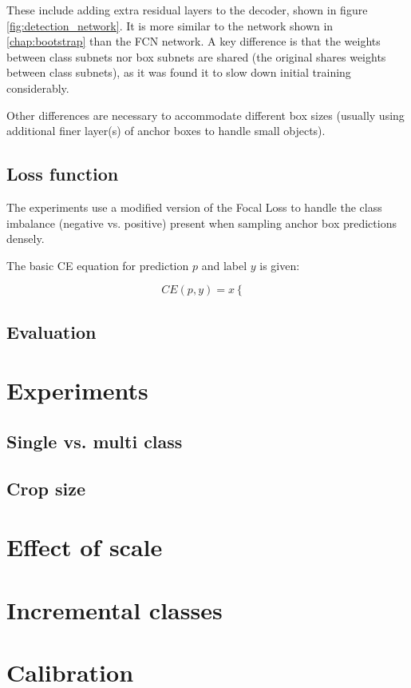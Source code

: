 These include adding extra residual layers to the decoder, shown in figure \ref{fig:detection_network}. It is more similar to the network shown in  \ref{chap:bootstrap} than the \gls{FCN} network. A key difference is that the weights between class subnets nor box subnets are shared (the original shares weights between class subnets), as it was found it to slow down initial training considerably. 


Other differences are necessary to accommodate different box sizes (usually using additional finer layer(s) of anchor boxes to handle small objects).

\subsection {Loss function}
\label{sec:loss}


The experiments use a modified version of the Focal Loss \cite{Lin2017} to handle the class imbalance (negative vs. positive) present when sampling anchor box predictions densely.

The basic \gls{CE} equation for prediction $p$ and label $y$ is given:

\begin{equation}
CE(p, y) = x
  \begin{cases}
  \end{cases}
\label{eq:cross_entropy}
\end{equation}



\subsection {Evaluation}
\label{sec:evaluation}



\section{Experiments}
\label{sec:detection_experiments}



\subsection {Single vs. multi class}
\label{sec:multi_class}



\subsection {Crop size}
\label{sec:crop_size}



\section {Effect of scale}
\label{sec:detection_architecture}



\section {Incremental classes}
\label{sec:incremental}


\section {Calibration}
\label{sec:calibration}
